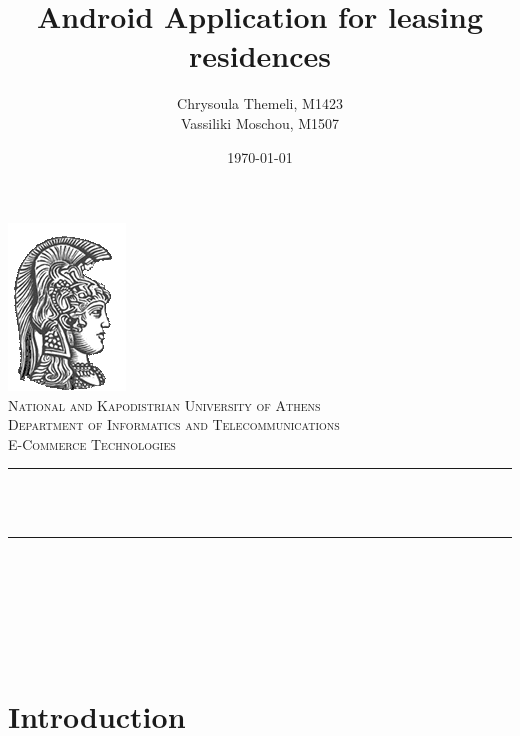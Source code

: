 \documentclass[12pt]{article}
\title{Android Application for leasing residences}
\author{ Chrysoula Themeli, M1423\\
	Vassiliki Moschou, M1507}                               %
\date{\today}                                           %
\makeatletter
\let\thetitle\@title
\let\theauthor\@author
\let\thedate\@date
\makeatother
\begin{document}
	
	\begin{titlepage}
		\centering
		\vspace*{0.5 cm}
		\includegraphics[scale = 0.75]{ekpalogo.png}\\[1.0 cm]   %
		\textsc{\LARGE National and Kapodistrian University of Athens}\\[2.0 cm]   %
		\textsc{\Large Department of Informatics and Telecommunications}\\[0.5 cm]               %
		\textsc{\large E-Commerce Technologies}\\[0.5 cm]               %
		\rule{\linewidth}{0.2 mm} \\[0.4 cm]
		{ \huge \bfseries \thetitle}\\
		\rule{\linewidth}{0.2 mm} \\[1.5 cm]
		
		\begin{minipage}{0.4\textwidth}
			\begin{center} \large
				\theauthor
			\end{center}
		\end{minipage}~
		\begin{minipage}{0.4\textwidth}
		\end{minipage}\\[2 cm]
		
		{\large \thedate}\\[2 cm]
		
		\vfill
		
	\end{titlepage}
	
	
	\tableofcontents
	\listoffigures
	\newpage
	
	
	\section{Introduction}
	
\end{document}
